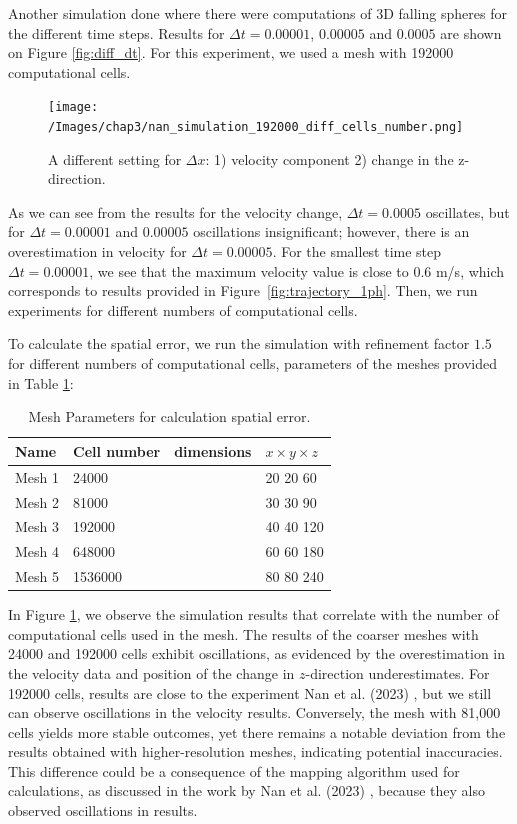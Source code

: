 Another simulation done where there were computations of 3D falling spheres for the different time steps. Results for $\Delta t = 0.00001$, $0.00005$ and $0.0005$ are shown on Figure \ref{fig:diff_dt}. For this experiment, we used a mesh with 192000 computational cells.
\begin{figure}[H]
    \centering
    \texttt{[image: /Images/chap3/nan\_simulation\_192000\_diff\_cells\_number.png]}
    \caption{A different setting for $\Delta x$: 1) velocity component 2) change in the z-direction.}
    \label{fig:cell_num}
\end{figure}
As we can see from the results for the velocity change, $\Delta t = 0.0005$ oscillates, but for $\Delta t = 0.00001$ and $0.00005$ oscillations insignificant; however, there is an overestimation in velocity for $\Delta t = 0.00005$. For the smallest time step $\Delta t = 0.00001$, we see that the maximum velocity value is close to $0.6$ m/s, which corresponds to results provided in Figure~\ref{fig:trajectory_1ph}. Then, we run experiments for different numbers of computational cells.

To calculate the spatial error, we run the simulation with refinement factor $1.5$ for different numbers of computational cells, parameters of the meshes provided in Table \ref{table1-chap4}:

\begin{table}[H]
    \centering
    \caption{Mesh Parameters for calculation spatial error. } \label{table1-chap4}
    \begin{tabular}{llll}
        \toprule
        \hline
        Name     & Cell number & dimensions&$x\times y \times z $\\
        \hline
        \midrule
        Mesh 1   & 24000 && 20 20 60\\
        Mesh 2 & 81000 & &30 30 90\\
        Mesh 3 & 192000 &&40 40 120 \\
        Mesh 4 & 648000 & &60 60 180 \\
        Mesh 5 & 1536000 & &80 80 240\\
        \hline
        \bottomrule
     \end{tabular}
\end{table}

In Figure \ref{fig:cell_num}, we observe the simulation results that correlate with the number of computational cells used in the mesh. The results of the coarser meshes with 24000 and 192000 cells exhibit oscillations, as evidenced by the overestimation in the velocity data and position of the change in $z$-direction underestimates. For 192000 cells, results are close to the experiment Nan et al. (2023) \cite{nan2023high}, but we still can observe oscillations in the velocity results. Conversely, the mesh with 81,000 cells yields more stable outcomes, yet there remains a notable deviation from the results obtained with higher-resolution meshes, indicating potential inaccuracies. This difference could be a consequence of the mapping algorithm used for calculations, as discussed in the work by Nan et al. (2023) \cite{nan2023high}, because they also observed oscillations in results.

